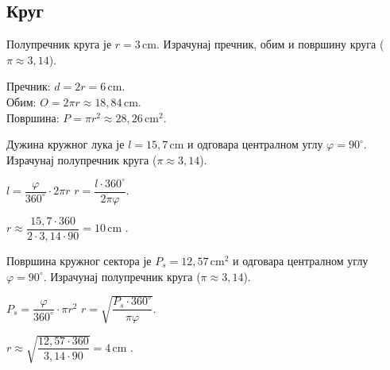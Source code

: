 \documentclass[11pt,a5paper,twoside,addpoints,answers]{exam} %
\newcommand{\measure}[2]{#1\,\mathrm{#2}}
\newcommand{\variant}[3]{#1}
\begin{document}
\begin{questions}
\section*{Круг}

\question[3]
Полупречник круга је $r=\measure{\variant{3}{5}{7}}{cm}$. Израчунај пречник, обим и површину круга ($\pi\approx 3{,}14$).
\begin{solution}[\stretch 4]
Пречник: $d=2r=\measure{\variant{6}{10}{14}}{cm}$. \\
Обим: $O=2\pi r\approx\measure{\variant{18{,}84}{31{,}40}{43{,}96}}{cm}$. \\
Површина: $P=\pi r^2\approx\measure{\variant{28{,}26}{78{,}50}{153{,}86}}{cm^2}$.
\end{solution}

\ifprintanswers\else\newpage\fi

\question[4]
Дужина кружног лука је $l=\measure{\variant{15{,}7}{18{,}84}{31{,}4}}{cm}$ и одговара централном углу $\varphi=\variant{90^\circ}{120^\circ}{180^\circ}$. Израчунај полупречник круга ($\pi\approx 3{,}14$).
\begin{solution}[\stretch 3]
$l=\dfrac{\varphi}{360^\circ}\cdot 2\pi r$  
$r=\dfrac{l\cdot 360^\circ}{2\pi\varphi}$.  
\variant{
$r\approx\dfrac{15{,}7\cdot 360}{2\cdot 3{,}14\cdot 90}=\measure{10}{cm}$
}{
$r\approx\dfrac{18{,}84\cdot 360}{2\cdot 3{,}14\cdot 120}=\measure{9}{cm}$
}{
$r\approx\dfrac{31{,}4\cdot 360}{2\cdot 3{,}14\cdot 180}=\measure{10}{cm}$
}.
\end{solution}

\question[4]
Површина кружног сектора је $P_s=\measure{\variant{12{,}57}{25{,}13}{50{,}27}}{cm^2}$ и одговара централном углу $\varphi=\variant{90^\circ}{180^\circ}{270^\circ}$. Израчунај полупречник круга ($\pi\approx 3{,}14$).
\begin{solution}[\stretch 3]
$P_s=\dfrac{\varphi}{360^\circ}\cdot \pi r^2$  
$r=\sqrt{\dfrac{P_s\cdot 360^\circ}{\pi\varphi}}$.  
\variant{
$r\approx\sqrt{\dfrac{12{,}57\cdot 360}{3{,}14\cdot 90}}=\measure{4}{cm}$
}{
$r\approx\sqrt{\dfrac{25{,}13\cdot 360}{3{,}14\cdot 180}}=\measure{4}{cm}$
}{
$r\approx\sqrt{\dfrac{50{,}27\cdot 360}{3{,}14\cdot 270}}=\measure{4}{cm}$
}.
\end{solution}

\end{questions}
\end{document}

